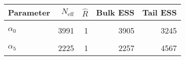 \begin{table}[!h]
\centering
\begin{tabular}{>{\raggedright\arraybackslash}p{2cm}rrrr}
\toprule
Parameter & $N_{\text{eff}}$ & $\widehat{R}$ & Bulk ESS & Tail ESS\\
\midrule
\cellcolor{gray!6}{$\rho$} & \cellcolor{gray!6}{40378} & \cellcolor{gray!6}{1} & \cellcolor{gray!6}{40446} & \cellcolor{gray!6}{42979}\\
$\alpha_{0}$ & 3991 & 1 & 3905 & 3245\\
\cellcolor{gray!6}{$\alpha_{2}$} & \cellcolor{gray!6}{3941} & \cellcolor{gray!6}{1} & \cellcolor{gray!6}{3954} & \cellcolor{gray!6}{3364}\\
$\alpha_{5}$ & 2225 & 1 & 2257 & 4567\\
\bottomrule
\end{tabular}
\end{table}